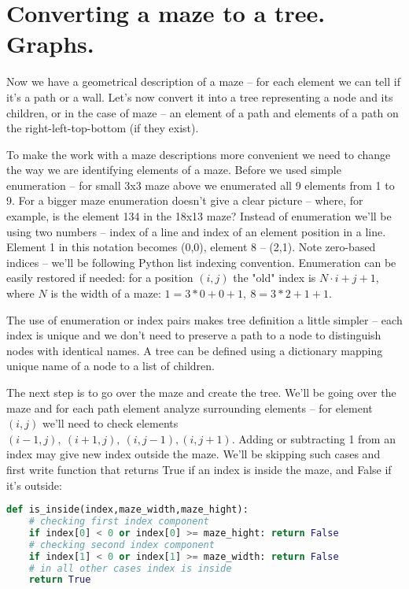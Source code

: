 \section{Converting a maze to a tree. Graphs.}

Now we have a geometrical description
of a maze -- for each element we can tell if it's a path or a wall.
Let's now convert it into a tree representing a node and its children,
or in the case of maze -- an element of a path and
elements of a path on the right-left-top-bottom (if they exist).

To make the work with a maze descriptions more convenient we need to
change the way we are identifying elements of a maze. Before we
used simple enumeration -- for small 3x3 maze above we enumerated all
9 elements from 1 to 9. For a bigger maze enumeration doesn't give a
clear picture -- where, for example, is the element 134 in the 18x13 maze?
 Instead of enumeration we'll be using two numbers -- index of a line
and index of an element position in a line. Element 1 in this notation
becomes (0,0), element 8 -- (2,1). Note zero-based indices -- we'll be
following Python list indexing convention. Enumeration can be easily
restored if needed: for a position $(i,j)$ the "old" 
index is $N\cdot i+j+1$,
where $N$ is the width of a maze: $1=3*0+0+1,\ 8=3*2+1+1$.

The use of enumeration or index pairs makes tree definition 
a little simpler --
each index is unique and we don't need to preserve a path to a node to
distinguish nodes with identical names. A tree can be defined using a
dictionary mapping unique name of a node to a list of children.

The next step is to go over the maze and create the tree. We'll be
going over the maze and for each path element analyze 
surrounding elements --
for element $(i,j)$ we'll need to check elements
$(i-1,j),\ (i+1,j),\ (i,j-1), (i,j+1)$. Adding or subtracting 1
from an index may give new index outside the maze. We'll be
skipping such cases and first write function that returns True
if an index is inside the maze, and False if it's outside:

\begin{lstlisting}[language=Python,style=codelst2,caption={Python: checking index position}]
def is_inside(index,maze_width,maze_hight):
    # checking first index component
    if index[0] < 0 or index[0] >= maze_hight: return False
    # checking second index component
    if index[1] < 0 or index[1] >= maze_width: return False
    # in all other cases index is inside
    return True
\end{lstlisting}

